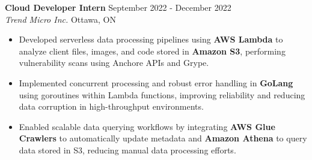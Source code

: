\documentclass[a4paper]{article}
\begin{document}
\textbf{Cloud Developer Intern} \hfill September 2022 - December 2022\\
\textit{Trend Micro Inc.} \hfill Ottawa, ON\\
\vspace{-2mm}
\begin{itemize} \itemsep -2pt

\item Developed serverless data processing pipelines using \textbf{AWS Lambda} to analyze client files, images, and code stored in \textbf{Amazon S3}, performing vulnerability scans using Anchore APIs and Grype.

\item Implemented concurrent processing and robust error handling in \textbf{GoLang} using goroutines within Lambda functions, improving reliability and reducing data corruption in high-throughput environments.

\item Enabled scalable data querying workflows by integrating \textbf{AWS Glue Crawlers} to automatically update metadata and \textbf{Amazon Athena} to query data stored in S3, reducing manual data processing efforts.



\end{itemize}


\end{document}
